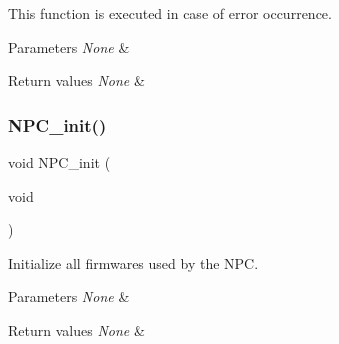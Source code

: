 This function is executed in case of error occurrence. 


\begin{DoxyParams}{Parameters}
{\em None} & \\
\hline
\end{DoxyParams}

\begin{DoxyRetVals}{Return values}
{\em None} & \\
\hline
\end{DoxyRetVals}
\mbox{\label{group___configuration_gabe73c51b6f7ce590321d186bef079fe4}} 
\subsubsection{\texorpdfstring{N\+P\+C\+\_\+init()}{NPC\_init()}}
{\footnotesize\ttfamily void N\+P\+C\+\_\+init (\begin{DoxyParamCaption}\item[{void}]{ }\end{DoxyParamCaption})}



Initialize all firmwares used by the N\+PC. 


\begin{DoxyParams}{Parameters}
{\em None} & \\
\hline
\end{DoxyParams}

\begin{DoxyRetVals}{Return values}
{\em None} & \\
\hline
\end{DoxyRetVals}
